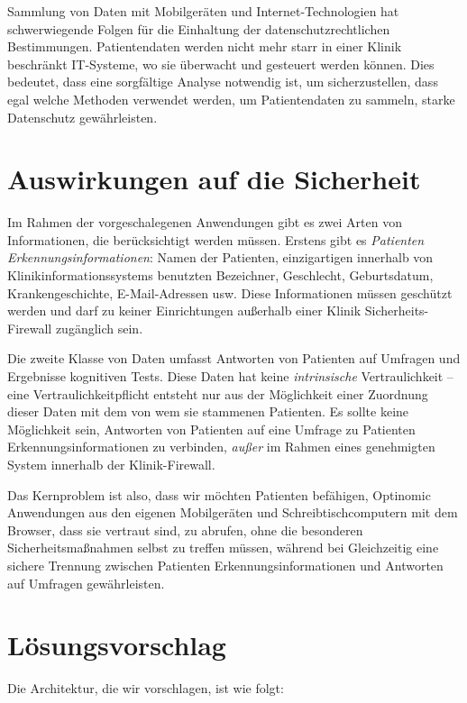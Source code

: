 \documentclass[DIV=calc,paper=a4,fontsize=11pt,twocolumn]{scrartcl}
\begin{document}
Sammlung von Daten mit Mobilgeräten und Internet-Technologien hat
schwerwiegende Folgen für die Einhaltung der datenschutzrechtlichen
Bestimmungen. Patientendaten werden nicht mehr starr in einer Klinik
beschränkt IT-Systeme, wo sie überwacht und gesteuert werden
können. Dies bedeutet, dass eine sorgfältige Analyse notwendig ist, um
sicherzustellen, dass egal welche Methoden verwendet werden, um
Patientendaten zu sammeln, starke Datenschutz gewährleisten.

\section*{Auswirkungen auf die Sicherheit}

Im Rahmen der vorgeschalegenen Anwendungen gibt es zwei Arten von
Informationen, die berücksichtigt werden müssen. Erstens gibt es
\emph{Patienten Erkennungsinformationen}: Namen der Patienten,
einzigartigen innerhalb von Klinikinformationssystems benutzten
Bezeichner, Geschlecht, Geburtsdatum, Krankengeschichte,
E-Mail-Adressen usw. Diese Informationen müssen geschützt werden und
darf zu keiner Einrichtungen außerhalb einer Klinik
Sicherheits-Firewall zugänglich sein.

Die zweite Klasse von Daten umfasst Antworten von Patienten auf
Umfragen und Ergebnisse kognitiven Tests. Diese Daten hat keine
\emph{intrinsische} Vertraulichkeit -- eine Vertraulichkeitpflicht
entsteht nur aus der Möglichkeit einer Zuordnung dieser Daten mit dem
von wem sie stammenen Patienten. Es sollte keine Möglichkeit sein,
Antworten von Patienten auf eine Umfrage zu Patienten
Erkennungsinformationen zu verbinden, \emph{außer} im Rahmen eines
genehmigten System innerhalb der Klinik-Firewall.

Das Kernproblem ist also, dass wir möchten Patienten befähigen,
Optinomic Anwendungen aus den eigenen Mobilgeräten und
Schreibtischcomputern mit dem Browser, dass sie vertraut sind, zu
abrufen, ohne die besonderen Sicherheitsmaßnahmen selbst zu treffen
müssen, während bei Gleichzeitig eine sichere Trennung zwischen
Patienten Erkennungsinformationen und Antworten auf Umfragen
gewährleisten.


\section*{Lösungsvorschlag}

Die Architektur, die wir vorschlagen, ist wie folgt:
\end{document}
